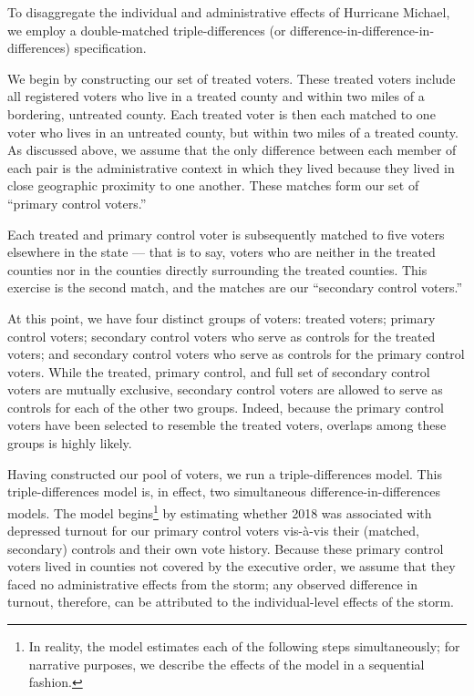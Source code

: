 \documentclass[
  12pt,
]{article}
\begin{document}
To disaggregate the individual and administrative effects of Hurricane Michael, we employ a double-matched triple-differences (or difference-in-difference-in-differences) specification.

We begin by constructing our set of treated voters. These treated voters include all registered voters who live in a treated county and within two miles of a bordering, untreated county. Each treated voter is then each matched to one voter who lives in an untreated county, but within two miles of a treated county. As discussed above, we assume that the only difference between each member of each pair is the administrative context in which they lived because they lived in close geographic proximity to one another. These matches form our set of ``primary control voters.''

Each treated and primary control voter is subsequently matched to five voters elsewhere in the state --- that is to say, voters who are neither in the treated counties nor in the counties directly surrounding the treated counties. This exercise is the second match, and the matches are our ``secondary control voters.''

At this point, we have four distinct groups of voters: treated voters; primary control voters; secondary control voters who serve as controls for the treated voters; and secondary control voters who serve as controls for the primary control voters. While the treated, primary control, and full set of secondary control voters are mutually exclusive, secondary control voters are allowed to serve as controls for each of the other two groups. Indeed, because the primary control voters have been selected to resemble the treated voters, overlaps among these groups is highly likely.

Having constructed our pool of voters, we run a triple-differences model. This triple-differences model is, in effect, two simultaneous difference-in-differences models. The model begins\footnote{In reality, the model estimates each of the following steps simultaneously; for narrative purposes, we describe the effects of the model in a sequential fashion.} by estimating whether 2018 was associated with depressed turnout for our primary control voters vis-à-vis their (matched, secondary) controls and their own vote history. Because these primary control voters lived in counties not covered by the executive order, we assume that they faced no administrative effects from the storm; any observed difference in turnout, therefore, can be attributed to the individual-level effects of the storm.
\end{document}
